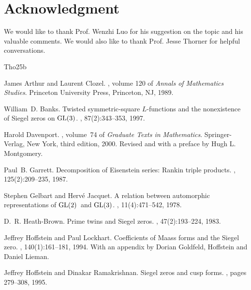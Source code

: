 \documentclass[12pt]{amsart}
\begin{document}
\section*{Acknowledgment}
We would like to thank Prof. Wenzhi Luo for his suggestion on the topic and his valuable comments. We would also like to thank Prof. Jesse Thorner for helpful conversations.


\begin{thebibliography}{Tho25b}

James Arthur and Laurent Clozel.
, volume 120 of {\em Annals of Mathematics Studies}.
\newblock Princeton University Press, Princeton, NJ, 1989.

William~D. Banks.
\newblock Twisted symmetric-square {$L$}-functions and the nonexistence of {S}iegel zeros on {${\rm GL}(3)$}.
, 87(2):343--353, 1997.

Harold Davenport.
, volume~74 of {\em Graduate Texts in Mathematics}.
\newblock Springer-Verlag, New York, third edition, 2000.
\newblock Revised and with a preface by Hugh L. Montgomery.

Paul~B. Garrett.
\newblock Decomposition of {E}isenstein series: {R}ankin triple products.
, 125(2):209--235, 1987.

Stephen Gelbart and Herv\'e Jacquet.
\newblock A relation between automorphic representations of {${\rm GL}(2)$}\ and {${\rm GL}(3)$}.
, 11(4):471--542, 1978.

D.~R. Heath-Brown.
\newblock Prime twins and {S}iegel zeros.
, 47(2):193--224, 1983.

Jeffrey Hoffstein and Paul Lockhart.
\newblock Coefficients of {M}aass forms and the {S}iegel zero.
, 140(1):161--181, 1994.
\newblock With an appendix by Dorian Goldfeld, Hoffstein and Daniel Lieman.

Jeffrey Hoffstein and Dinakar Ramakrishnan.
\newblock Siegel zeros and cusp forms.
, pages 279--308, 1995.


\end{thebibliography}
\end{document}
